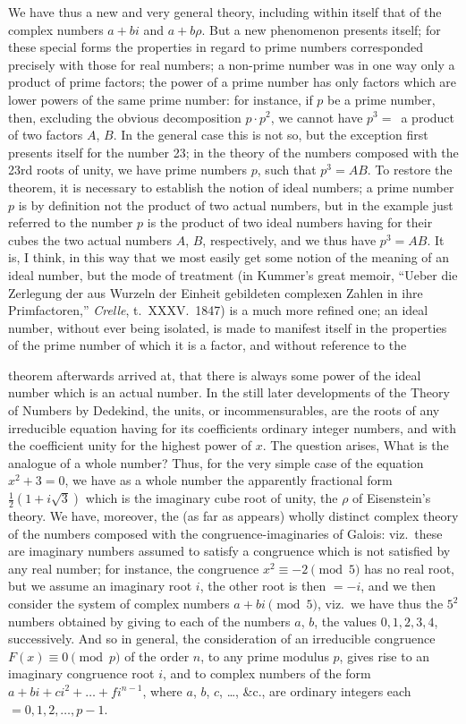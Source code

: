 \documentclass[12pt,a4paper,oneside]{book}
\begin{document}
We have thus a new and very general theory, including within itself that of the complex numbers $a+bi$ and $a+b\rho$. But a new phenomenon presents itself; for these special forms the properties in regard to prime numbers corresponded precisely with those for real numbers; a non-prime number was in one way only a product of prime factors; the power of a prime number has only factors which are lower powers of the same prime number: for instance, if $p$ be a prime number, then, excluding the obvious decomposition $p\cdot p^{2}$, we cannot have $p^{3}=$~a product of two factors $A$, $B$. In the general case this is not so, but the exception first presents itself for the number 23; in the theory of the numbers composed with the 23rd roots of unity, we have prime numbers $p$, such that $p^{3}=AB$. To restore the theorem, it is necessary to establish the notion of ideal numbers; a prime number $p$ is by definition not the product of two actual numbers, but in the example just referred to the number $p$ is the product of two ideal numbers having for their cubes the two actual numbers $A$, $B$, respectively, and we thus have $p^{3}=AB$. It is, I think, in this way that we most easily get some notion of the meaning of an ideal number, but the mode of treatment (in Kummer's great memoir, ``Ueber die Zerlegung der aus Wurzeln der Einheit gebildeten complexen Zahlen in ihre Primfactoren,'' \textit{Crelle}, t.~XXXV.\ 1847) is a much more refined one; an ideal number, without ever being isolated, is made to manifest itself in the properties of the prime number of which it is a factor, and without reference to the

\newpage
theorem afterwards arrived at, that there is always some power of the ideal number which is an actual number. In the still later developments of the Theory of Numbers by Dedekind, the units, or incommensurables, are the roots of any irreducible equation having for its coefficients ordinary integer numbers, and with the coefficient unity for the highest power of $x$. The question arises, What is the analogue of a whole number? Thus, for the very simple case of the equation $x^{2}+3=0$, we have as a whole number the apparently fractional form $\tfrac{1}{2}(1+i\surd 3)$ which is the imaginary cube root of unity, the $\rho$ of Eisenstein's theory. We have, moreover, the (as far as appears) wholly distinct complex theory of the numbers composed with the congruence-imaginaries of Galois: viz.\ these are imaginary numbers assumed to satisfy a congruence which is not satisfied by any real number; for instance, the congruence $x^{2}\equiv -2\pmod{5}$ has no real root, but we assume an imaginary root $i$, the other root is then $=-i$, and we then consider the system of complex numbers $a+bi\pmod 5$, viz.\ we have thus the $5^{2}$ numbers obtained by giving to each of the numbers $a$, $b$, the values $0,1,2,3,4$, successively. And so in general, the consideration of an irreducible congruence $F(x)\equiv 0\pmod p$ of the order $n$, to any prime modulus $p$, gives rise to an imaginary congruence root $i$, and to complex numbers of the form $a+bi+ci^{2}+\dots+fi^{n-1}$, where $a$, $b$, $c$, \dots, \&c., are ordinary integers each $=0,1,2,\dots,p-1$.
\end{document}
